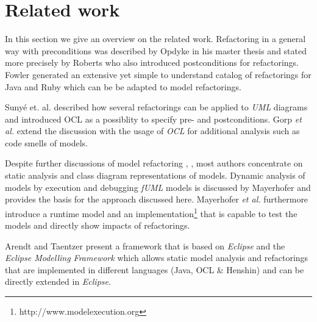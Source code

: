 \documentclass{llncs}
\begin{document}
\section{Related work}
\label{sec:relatedwork}

In this section we give an overview on the related work. Refactoring in a general way with preconditions was described
by Opdyke \cite{mast:REFOOF} in his master thesis and stated more precisely by Roberts \cite{rob99} who also introduced
postconditions for refactorings. Fowler \cite{fow99} generated an extensive yet simple to understand catalog of
refactorings for Java and Ruby which can be be adapted to model refactorings.


Suny{\'e} et. al. \cite{DBLP:conf/uml/SunyePTJ01} described how several refactorings can be applied to \textit{UML}
diagrams and introduced OCL as a possiblity to specify pre- and postconditions. Gorp \textit{et al.} \cite{gorp03} extend the
discussion with the usage of \textit{OCL} for additional analysis such as code smells of models.


Despite further discussions of model refactoring \cite{DBLP:conf/uml/CorreaW04}, \cite{DBLP:conf/ershov/BaarM06},
\cite{DBLP:journals/ase/ArendtT13} most authors concentrate on static analysis and class diagram representations of
models. Dynamic analysis of models by execution and debugging \textit{fUML} models is discussed by Mayerhofer
\cite{DBLP:conf/icse/Mayerhofer12} and provides the basis for the approach discussed here. Mayerhofer \textit{et al.}
\cite{DBLP:conf/models/MayerhoferLK12} furthermore introduce a runtime model and an
implementation\footnote{http://www.modelexecution.org} that is capable to test the models and directly show impacts of
refactorings.


Arendt and Taentzer \cite{DBLP:journals/ase/ArendtT13} present a framework that is based on \textit{Eclipse} and the
\textit{Eclipse Modelling Framework} which allows static model analysis and refactorings that are implemented in
different languages (Java, OCL \& Henshin) and can be directly extended in \textit{Eclipse}.
\end{document}
